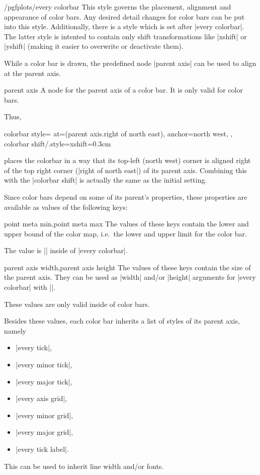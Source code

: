 \begin{stylekey}{/pgfplots/every colorbar}
	This style governs the placement, alignment and appearance of color bars. Any desired detail changes for color bars can be put into this style. Additionally, there is a style  which is set after |every colorbar|. The latter style is intented to contain only shift transformations like |xshift| or |yshift| (making it easier to overwrite or deactivate them).

	While a color bar is drawn, the predefined node |parent axis| can be used to align at the parent axis.
\begin{predefinednode}{parent axis}
	A node for the parent axis of a color bar. It is only valid for color bars.
\end{predefinednode}

	Thus, 
\begin{codeexample}
colorbar style={
	at={(parent axis.right of north east)},
	anchor=north west,
},
colorbar shift/.style={xshift=0.3cm}
\end{codeexample}
	\noindent places the colorbar in a way that its top-left (north west) corner is aligned right of the top right corner (|right of north east|) of its parent axis. Combining this with the |colorbar shift| is actually the same as the initial setting.

	Since color bars depend on some of its parent's properties, these properties are available as values of the following keys:
\begin{pgfplotskeylist}{point meta min,point meta max}
	The values of these keys contain the lower and upper bound of the color map, i.e.\ the lower and upper limit for the color bar. 
	
	The value is || inside of |every colorbar|.
\end{pgfplotskeylist}
\begin{pgfplotskeylist}{parent axis width,parent axis height}
	The values of these keys contain the size of the parent axis. They can be used as |width| and/or |height| arguments for |every colorbar| with ||.

	These values are only valid inside of color bars.
\end{pgfplotskeylist}

	Besides these values, each color bar inherits a list of styles of its parent axis, namely

	\begin{itemize}
		\item |every tick|,
		\item |every minor tick|,
		\item |every major tick|,
		\item |every axis grid|,
		\item |every minor grid|,
		\item |every major grid|,
		\item |every tick label|.
	\end{itemize}
	This can be used to inherit line width and/or fonts.


\end{stylekey}
